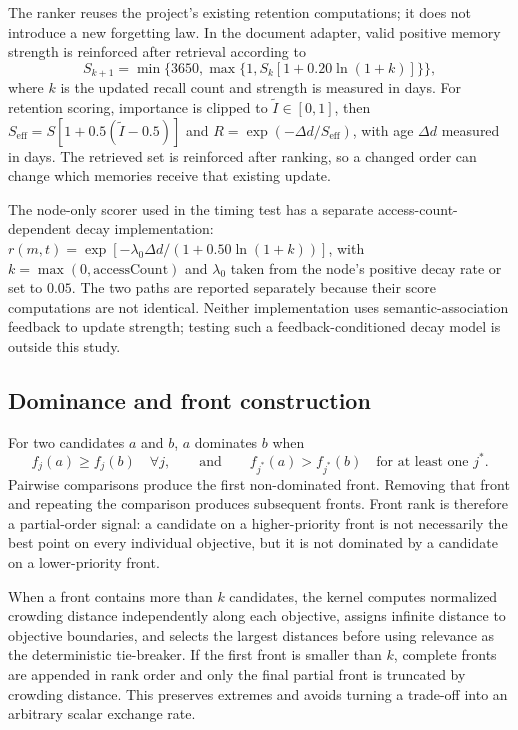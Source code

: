 \documentclass[review,12pt]{elsarticle}
\begin{document}
The ranker reuses the project's existing retention computations; it does not introduce a new forgetting law. In the document adapter, valid positive memory strength is reinforced after retrieval according to
\begin{equation*}
    S_{k+1}=\min\{3650,\max\{1,S_k[1+0.20\ln(1+k)]\}\},
\end{equation*}
where $k$ is the updated recall count and strength is measured in days. For retention scoring, importance is clipped to $\tilde I\in[0,1]$, then $S_{\mathrm{eff}}=S[1+0.5(\tilde I-0.5)]$ and $R=\exp(-\Delta d/S_{\mathrm{eff}})$, with age $\Delta d$ measured in days. The retrieved set is reinforced after ranking, so a changed order can change which memories receive that existing update.

The node-only scorer used in the timing test has a separate access-count-dependent decay implementation: $r(m,t)=\exp[-\lambda_0\Delta d/(1+0.50\ln(1+k))]$, with $k=\max(0,\mathrm{accessCount})$ and $\lambda_0$ taken from the node's positive decay rate or set to $0.05$. The two paths are reported separately because their score computations are not identical. Neither implementation uses semantic-association feedback to update strength; testing such a feedback-conditioned decay model is outside this study.

\subsection{Dominance and front construction}

For two candidates $a$ and $b$, $a$ dominates $b$ when
\begin{equation}
    f_j(a)\geq f_j(b)\quad\forall j,
    \qquad\text{and}\qquad
    f_{j^*}(a)>f_{j^*}(b)\quad\text{for at least one }j^*.
    \label{eq:dominance}
\end{equation}
Pairwise comparisons produce the first non-dominated front. Removing that front and repeating the comparison produces subsequent fronts. Front rank is therefore a partial-order signal: a candidate on a higher-priority front is not necessarily the best point on every individual objective, but it is not dominated by a candidate on a lower-priority front.

When a front contains more than $k$ candidates, the kernel computes normalized crowding distance independently along each objective, assigns infinite distance to objective boundaries, and selects the largest distances before using relevance as the deterministic tie-breaker. If the first front is smaller than $k$, complete fronts are appended in rank order and only the final partial front is truncated by crowding distance. This preserves extremes and avoids turning a trade-off into an arbitrary scalar exchange rate.
\end{document}
